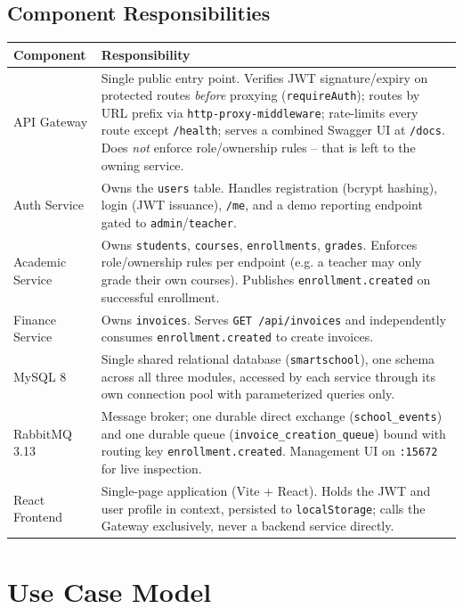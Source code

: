 \documentclass[11pt,a4paper]{report}
\begin{document}
\section{Component Responsibilities}
\begin{longtable}{L{3.0cm} L{11.0cm}}
\toprule
\textbf{Component} & \textbf{Responsibility} \\
\midrule
\endhead
API Gateway & Single public entry point. Verifies JWT signature/expiry on protected routes \emph{before} proxying (\texttt{requireAuth}); routes by URL prefix via \texttt{http-proxy-middleware}; rate-limits every route except \texttt{/health}; serves a combined Swagger UI at \texttt{/docs}. Does \emph{not} enforce role/ownership rules -- that is left to the owning service. \\
Auth Service & Owns the \texttt{users} table. Handles registration (bcrypt hashing), login (JWT issuance), \texttt{/me}, and a demo reporting endpoint gated to \texttt{admin}/\texttt{teacher}. \\
Academic Service & Owns \texttt{students}, \texttt{courses}, \texttt{enrollments}, \texttt{grades}. Enforces role/ownership rules per endpoint (e.g. a teacher may only grade their own courses). Publishes \texttt{enrollment.created} on successful enrollment. \\
Finance Service & Owns \texttt{invoices}. Serves \texttt{GET /api/invoices} and independently consumes \texttt{enrollment.created} to create invoices. \\
MySQL 8 & Single shared relational database (\texttt{smartschool}), one schema across all three modules, accessed by each service through its own connection pool with parameterized queries only. \\
RabbitMQ 3.13 & Message broker; one durable direct exchange (\texttt{school\_events}) and one durable queue (\texttt{invoice\_creation\_queue}) bound with routing key \texttt{enrollment.created}. Management UI on \texttt{:15672} for live inspection. \\
React Frontend & Single-page application (Vite + React). Holds the JWT and user profile in context, persisted to \texttt{localStorage}; calls the Gateway exclusively, never a backend service directly. \\
\bottomrule
\end{longtable}

\chapter{Use Case Model}
\end{document}
